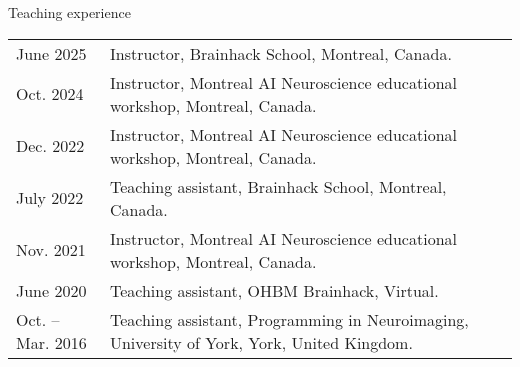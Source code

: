 \documentclass{resume} %
\begin{document}

\begin{rSection}{Teaching experience}

\begin{tabular}{@{} l l @{\hspace{6ex}}}
  June 2025 & Instructor, Brainhack School, Montreal, Canada.\\
  Oct. 2024 & Instructor, Montreal AI Neuroscience educational workshop, Montreal, Canada.\\
  Dec. 2022 & Instructor, Montreal AI Neuroscience educational workshop, Montreal, Canada.\\
  July 2022 & Teaching assistant, Brainhack School, Montreal, Canada.\\
  Nov. 2021 & Instructor, Montreal AI Neuroscience educational workshop, Montreal, Canada.\\
  June 2020 & Teaching assistant, OHBM Brainhack, Virtual.\\
  Oct. -- Mar. 2016 & Teaching assistant, Programming in Neuroimaging, University of York, York, United Kingdom.\\
\end{tabular}
\end{rSection}


%
%
\end{document}
